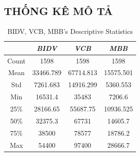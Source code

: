 \documentclass[conference]{IEEEtran}
\begin{document}
\subsection{THỐNG KÊ MÔ TẢ}
\begin{table}[htbp]
\caption{BIDV, VCB, MBB’s Descriptive Statistics}
\begin{center}
\begin{tabular}{|c|c|c|c|}
\hline
\textbf{} & \textbf{\textit{BIDV}} & \textbf{\textit{VCB}} & \textbf{\textit{MBB}} \\
\hline
Count & 1598 & 1598 & 1598 \\
\hline
Mean & 33466.789 & 67714.813 & 15575.501 \\
\hline
Std & 7261.683 & 14916.299 & 5360.553 \\
\hline
Min & 16531.4 & 35483 & 7206.6 \\
\hline
25\% & 28166.65 & 55687.75 & 10936.525 \\
\hline
50\% & 32375.3 & 67731 & 14605.7 \\
\hline
75\% & 38500 & 78577 & 18786.2 \\
\hline
Max & 54400 & 97400 & 28666.7 \\
\hline
\end{tabular}
\label{tab1}
\end{center}
\end{table}
\end{document}
